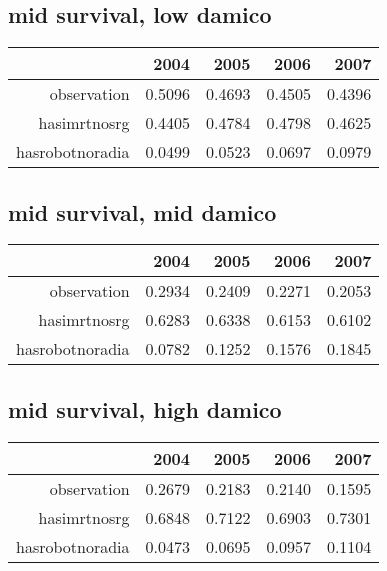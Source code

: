 \documentclass[12pt]{report}
\begin{document}
\subsection{mid survival, low damico}
\begin{table}[ht]
\begin{center}
\begin{tabular}{rrrrr}
  \hline
 & 2004 & 2005 & 2006 & 2007 \\ 
  \hline
observation & 0.5096 & 0.4693 & 0.4505 & 0.4396 \\ 
  hasimrtnosrg & 0.4405 & 0.4784 & 0.4798 & 0.4625 \\ 
  hasrobotnoradia & 0.0499 & 0.0523 & 0.0697 & 0.0979 \\ 
   \hline
\end{tabular}
\end{center}
\end{table}
\subsection{mid survival, mid damico}
\begin{table}[ht]
\begin{center}
\begin{tabular}{rrrrr}
  \hline
 & 2004 & 2005 & 2006 & 2007 \\ 
  \hline
observation & 0.2934 & 0.2409 & 0.2271 & 0.2053 \\ 
  hasimrtnosrg & 0.6283 & 0.6338 & 0.6153 & 0.6102 \\ 
  hasrobotnoradia & 0.0782 & 0.1252 & 0.1576 & 0.1845 \\ 
   \hline
\end{tabular}
\end{center}
\end{table}
\subsection{mid survival, high damico}
\begin{table}[ht]
\begin{center}
\begin{tabular}{rrrrr}
  \hline
 & 2004 & 2005 & 2006 & 2007 \\ 
  \hline
observation & 0.2679 & 0.2183 & 0.2140 & 0.1595 \\ 
  hasimrtnosrg & 0.6848 & 0.7122 & 0.6903 & 0.7301 \\ 
  hasrobotnoradia & 0.0473 & 0.0695 & 0.0957 & 0.1104 \\ 
   \hline
\end{tabular}
\end{center}
\end{table}
\pagebreak
\end{document}

